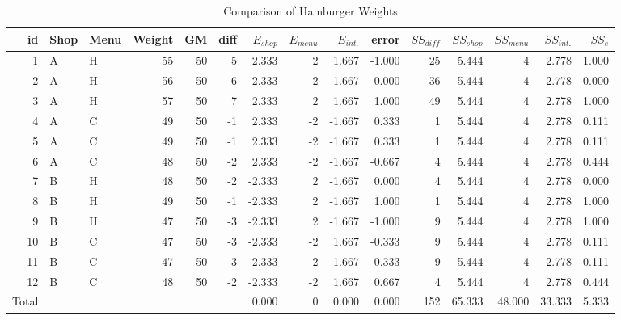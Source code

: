 \begin{landscape}
	\begin{table}[ht]
		\centering
		\caption{Comparison of Hamburger Weights}
		\begin{tabular}{rllrrrrrrrrrrrr}
			id    & Shop & Menu & Weight & GM & diff & $E_{shop}$ & $E_{menu}$ & $E_{int.}$ & error  & $SS_{diff}$ & $SS_{shop}$ & $SS_{menu}$ & $SS_{int.}$ & $SS_{e}$ \\\hline\hline
			1     & A    & H    & 55     & 50 & 5    & 2.333      & 2          & 1.667      & -1.000 & 25          & 5.444       & 4           & 2.778       & 1.000    \\
			2     & A    & H    & 56     & 50 & 6    & 2.333      & 2          & 1.667      & 0.000  & 36          & 5.444       & 4           & 2.778       & 0.000    \\
			3     & A    & H    & 57     & 50 & 7    & 2.333      & 2          & 1.667      & 1.000  & 49          & 5.444       & 4           & 2.778       & 1.000    \\
			4     & A    & C    & 49     & 50 & -1   & 2.333      & -2         & -1.667     & 0.333  & 1           & 5.444       & 4           & 2.778       & 0.111    \\
			5     & A    & C    & 49     & 50 & -1   & 2.333      & -2         & -1.667     & 0.333  & 1           & 5.444       & 4           & 2.778       & 0.111    \\
			6     & A    & C    & 48     & 50 & -2   & 2.333      & -2         & -1.667     & -0.667 & 4           & 5.444       & 4           & 2.778       & 0.444    \\
			7     & B    & H    & 48     & 50 & -2   & -2.333     & 2          & -1.667     & 0.000  & 4           & 5.444       & 4           & 2.778       & 0.000    \\
			8     & B    & H    & 49     & 50 & -1   & -2.333     & 2          & -1.667     & 1.000  & 1           & 5.444       & 4           & 2.778       & 1.000    \\
			9     & B    & H    & 47     & 50 & -3   & -2.333     & 2          & -1.667     & -1.000 & 9           & 5.444       & 4           & 2.778       & 1.000    \\
			10    & B    & C    & 47     & 50 & -3   & -2.333     & -2         & 1.667      & -0.333 & 9           & 5.444       & 4           & 2.778       & 0.111    \\
			11    & B    & C    & 47     & 50 & -3   & -2.333     & -2         & 1.667      & -0.333 & 9           & 5.444       & 4           & 2.778       & 0.111    \\
			12    & B    & C    & 48     & 50 & -2   & -2.333     & -2         & 1.667      & 0.667  & 4           & 5.444       & 4           & 2.778       & 0.444    \\\hline
			Total &      &      &        &    &      & 0.000      & 0          & 0.000      & 0.000  & 152         & 65.333      & 48.000      & 33.333      & 5.333    \\\hline
		\end{tabular}
		\label{anovaExample2}
	\end{table}
\end{landscape}
